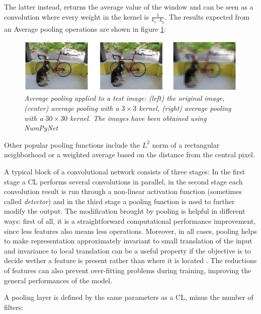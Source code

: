 \documentclass[12pt,a4paper]{report}
\begin{document}
The latter instead, returns the average value of the window and can be seen as a convolution where every weight in the kernel is $\frac{1}{k_x \cdot k_y}$.
The results expected from an Average pooling operations are shown in figure \ref{fig:avgpool:ex}:

\begin{figure}[h]
 \centering
 \includegraphics[scale=0.7]{./images/avgpool_layer.png}
 \caption{\it Average pooling applied to a test image: (left) the original image, (center) average pooling with a $3 \times 3$ kernel, (right) average pooling with a $30 \times 30$ kernel. The images have been obtained using NumPyNet}
 \label{fig:avgpool:ex}
\end{figure}

Other popular pooling functions include the $L^2$ norm of a rectangular neighborhood or a weighted average based on the distance from the central pixel.

A typical block of a convolutional network consists of three stages: In the first stage a CL performs several convolutions in parallel, in the second stage each convolution result is run through a non-linear activation function (sometimes called {\it detector}) and in the third stage a pooling function is used to further modify the output. 
The modification brought by pooling is helpful in different ways: first of all, it is a straightforward computational performance improvement, since less features also means less operations. 
Moreover, in all cases, pooling helps to make representation approximately invariant to small translation of the input and invariance to local translation can be a useful property if the objective is to decide wether a feature is present rather than where it is located \cite{Goodfellow-et-al-2016}.
The reductions of features can also prevent over-fitting problems during training, improving the general performances of the model. 

A pooling layer is defined by the same parameters as a CL, minus the number of filters:
\end{document}
